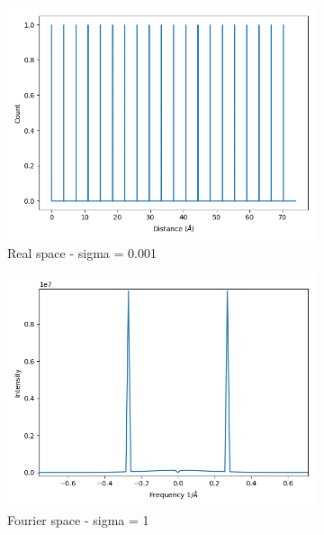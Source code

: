 \documentclass{article}
\begin{document}
\begin{figure}[h]
\begin{subfigure}{0.33\textwidth}
                \centering
                \includegraphics[width=\textwidth]{real_gauss_1d_lowsig.png}
                \caption{Real space - sigma = 0.001}\label{fig:real_gauss_1d_lowsig}
	\end{subfigure}
        \begin{subfigure}{0.33\textwidth}
                \centering
                \includegraphics[width=\textwidth]{fourier_gauss_1d_highsig.png}
                \caption{Fourier space - sigma = 1}\label{fourier_gauss_1d_highsig}
        \end{subfigure}
        \begin{subfigure}{0.33\textwidth}
                \centering

\end{subfigure}
\end{figure}
\end{document}
